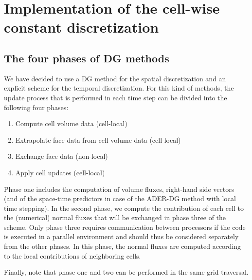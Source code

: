 \documentclass{scrreprt}
\begin{document}
\chapter{Implementation of the cell-wise constant discretization}

\section{The four phases of DG methods}
We have decided to use a DG method for the spatial
discretization and an explicit scheme for the temporal 
discretization. For this kind of methods, 
the update process that is performed in each time step 
can be divided into the following four phases:
\begin{enumerate}
  \item Compute cell volume data (cell-local)
  \item Extrapolate face data from cell volume data (cell-local)
  \item Exchange face data (non-local)
  \item Apply cell updates (cell-local)
\end{enumerate}
Phase one includes the computation of volume fluxes, right-hand side vectors
(and of the space-time predictors in case of the ADER-DG method with local
time stepping).
In the second phase, we compute the contribution of each cell to 
the (numerical) normal fluxes that will be exchanged in phase three of the
scheme.
Only phase three requires communication between processors if the
code is executed in a parallel environment and should thus be
considered separately from the other phases.
In this phase, the normal fluxes are computed according to the local
contributions of neighboring cells.

Finally, note that phase one and two can be performed in the same grid
traversal.
\end{document}
